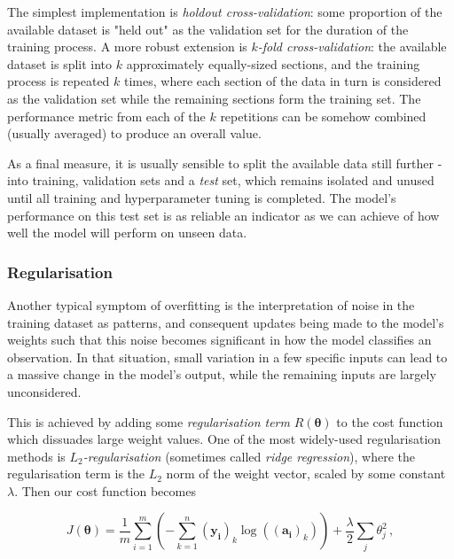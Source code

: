 \documentclass{article}[11pt]
\begin{document}
            The simplest implementation is \textit{holdout cross-validation}: some proportion of the available dataset is "held out" as the validation set for the duration of the training process. A more robust extension is \textit{$k$-fold cross-validation}: the available dataset is split into $k$ approximately equally-sized sections, and the training process is repeated $k$ times, where each section of the data in turn is considered as the validation set while the remaining sections form the training set. The performance metric from each of the $k$ repetitions can be somehow combined (usually averaged) to produce an overall value.
            
            As a final measure, it is usually sensible to split the available data still further - into training, validation sets and a \textit{test} set, which remains isolated and unused until all training and hyperparameter tuning is completed. The model's performance on this test set is as reliable an indicator as we can achieve of how well the model will perform on unseen data.
        
        
            
            
        \subsubsection{Regularisation}
            
            Another typical symptom of overfitting is the interpretation of noise in the training dataset as patterns, and consequent updates being made to the model's weights such that this noise becomes significant in how the model classifies an observation. In that situation, small variation in a few specific inputs can lead to a massive change in the model's output, while the remaining inputs are largely unconsidered.
            
            This is achieved by adding some \textit{regularisation term} $R(\boldsymbol{\theta})$ to the cost function which dissuades large weight values. One of the most widely-used regularisation methods is \textit{$L_2$-regularisation} (sometimes called \textit{ridge regression}), where the regularisation term is the $L_2$ norm of the weight vector, scaled by some constant $\lambda$. Then our cost function becomes
            
            $$
            J(\boldsymbol{\theta}) = \frac{1}{m} \sum_{i=1}^{m} \left( - \sum_{k=1}^{n} (\mathbf{y_i})_k \log(\mathbf{(a_i)}_k) \right) + \frac{\lambda}{2} \sum_j \theta_j^2 \,,
            $$
            
\end{document}
